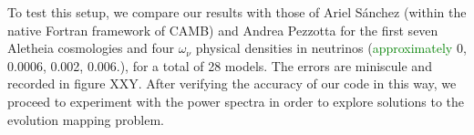 
To test this setup, we compare our results with those of Ariel S\'{a}nchez 
(within the native Fortran framework of CAMB) and Andrea Pezzotta for the
first seven Aletheia cosmologies and four $\omega_\nu$ physical densities in
neutrinos (\textcolor{green}{approximately} 0, 0.0006, 0.002, 0.006.), for a 
total of 28
models. The errors are miniscule and recorded in figure XXY. After verifying
the accuracy of our code in this way, we proceed to experiment with the power
spectra in order to explore solutions to the evolution mapping problem.


